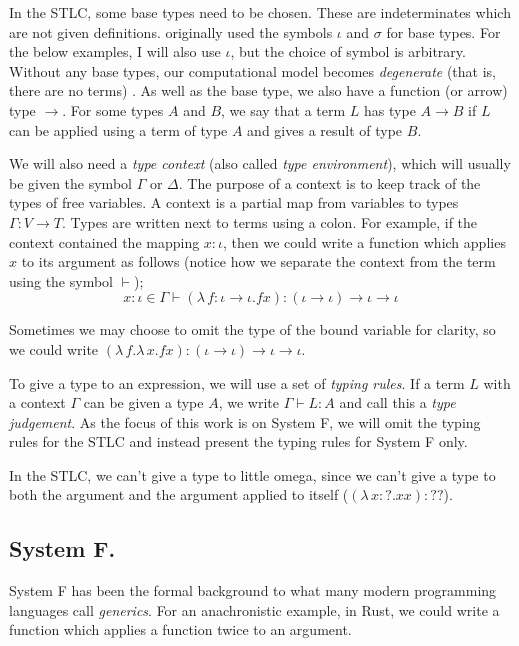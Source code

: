 In the STLC, some base types need to be chosen. These are indeterminates which are not given
definitions. \citet{church_formulation_1940} originally used the symbols $\iota$ and $\sigma$ for
base types. For the below examples, I will also use $\iota$, but the choice of symbol is arbitrary.
Without any base types, our computational model becomes \textit{degenerate} (that is, there are no
terms) \citep{pierce_types_2002}. As well as the base type, we also have a function (or arrow) type
$\to$. For some types $A$ and $B$, we say that a term $L$ has type $A \to B$ if $L$ can be applied
using a term of type $A$ and gives a result of type $B$.

We will also need a \textit{type context} (also called \textit{type environment}), which will
usually be given the symbol $\Gamma$ or $\Delta$. The purpose of a context is to keep track of the
types of free variables. A context is a partial map from variables to types $\Gamma \colon V \to T$.
Types are written next to terms using a colon. For example, if the context contained the mapping $x
\colon \iota$, then we could write a function which applies $x$ to its argument as follows (notice
how we separate the context from the term using the symbol $\vdash$);
\begin{equation*}
  x \colon \iota \in \Gamma \vdash (\lambda \, f \colon \iota \to \iota . f x)
  \colon (\iota \to \iota) \to \iota \to \iota
\end{equation*}

Sometimes we may choose to omit the type of the bound variable for clarity, so we could write
$(\lambda \, f. \lambda \, x. fx) \colon (\iota \to \iota) \to \iota \to \iota$.

To give a type to an expression, we will use a set of \textit{typing rules}. If a term $L$ with a
context $\Gamma$ can be given a type $A$, we write $\Gamma \vdash L \colon A$ and call this a
\textit{type judgement}. As the focus of this work is on System F, we will omit the typing rules for
the STLC and instead present the typing rules for System F only.

In the STLC, we can't give a type to little omega, since we can't give a type to both the argument
and the argument applied to itself ($(\lambda \, x  \colon ? . x x) \colon ??$).

\subsection{System F.}
System F has been the formal background to what many modern programming languages call
\textit{generics}. For an anachronistic example, in Rust, we could write a function which applies a
function twice to an argument.

